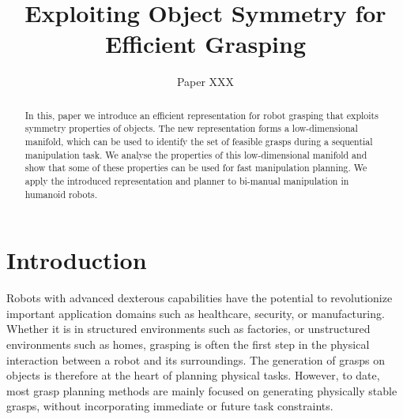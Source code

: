 \documentclass{aamas2015}
\begin{document}
\title{Exploiting Object Symmetry for Efficient Grasping}

\author{
\alignauthor
Paper XXX
}

\newcommand{\vech}[1]{\textbf{#1}}
\newcommand{\set}[1]{\textbf{#1}}

\maketitle



\begin{abstract}
In this, paper we introduce an efficient representation for robot grasping that exploits symmetry
properties of objects. The new representation forms a low-dimensional manifold, which can be used to
identify the set of feasible grasps during a sequential manipulation task. We analyse the properties
of this low-dimensional manifold and show that some of these properties can be used for fast
manipulation planning. We apply the introduced representation and planner to bi-manual manipulation
in humanoid robots.
\end{abstract}


\section{Introduction}
Robots with advanced dexterous capabilities have the potential
to revolutionize important application domains such as 
healthcare, security, or manufacturing. Whether it is in 
structured environments such as factories, or unstructured 
environments such as homes, grasping is often the first 
step in the physical interaction between a robot and 
its surroundings. The generation of grasps on objects 
is therefore at the heart of planning physical tasks.
However, to date, most grasp planning methods are mainly 
focused on generating physically stable grasps, without
incorporating immediate or future task constraints. 
\end{document}
